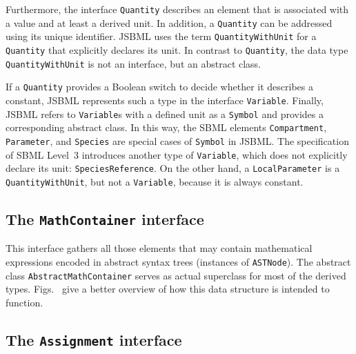 \documentclass[
  BCOR12mm,
  letterpaper,
  11pt,
  headsepline,
  pointlessnumbers,
  tablecaptionabove,
  onelinecaption,
  headinclude,
  appendixprefix,
  idxtotoc,
  bibtotoc,
  twoside,
  titlepage
]{scrartcl}
\begin{document}
Furthermore, the interface \texttt{Quantity}
describes an element that is associated with a value and at least a derived
unit. In addition, a \texttt{Quantity} can be addressed
using its unique identifier. JSBML uses the term \texttt{QuantityWithUnit} for
a \texttt{Quantity} that explicitly declares its unit. In contrast to
\texttt{Quantity}, the data type \texttt{QuantityWithUnit}
is not an interface, but an abstract class.

If a \texttt{Quantity} provides a Boolean
switch to decide whether it describes a constant,
JSBML represents such a type in the interface \texttt{Variable}.
Finally, JSBML refers to \texttt{Variable}s with a defined unit as a
\texttt{Symbol}
and provides a corresponding abstract class. In this way, the
SBML elements \texttt{Compartment}, \texttt{Parameter}, and \texttt{Species}
are special cases of \texttt{Symbol} in JSBML. The specification of SBML Level~3
introduces another type of \texttt{Variable}, which does not explicitly declare
its unit: \texttt{SpeciesReference}. On the other hand, a
\texttt{LocalParameter}
is a \texttt{QuantityWithUnit},
but not a \texttt{Variable}, because it is always constant.


\subsection{The \texttt{MathContainer} interface}

This interface gathers all those elements that may contain mathematical
expressions encoded in abstract syntax trees (instances of
\texttt{ASTNode}).
The abstract class \texttt{AbstractMathContainer}
serves as actual superclass
for most of the derived types.
Figs.~ give a better
overview of how this data structure is intended to function.


\subsection{The \texttt{Assignment} interface}
\end{document}
